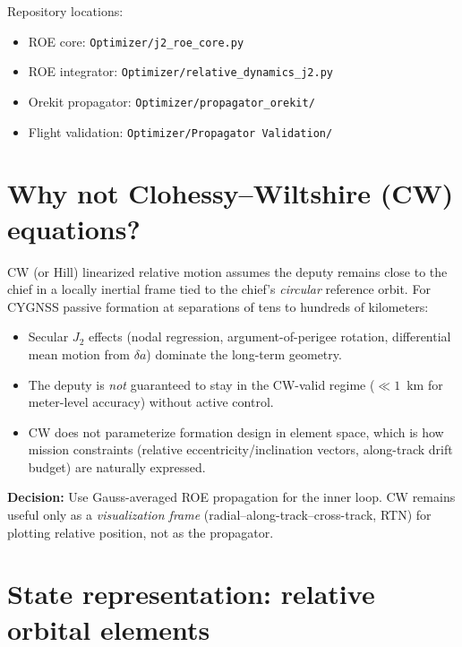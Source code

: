 \documentclass[11pt]{article}
\begin{document}
Repository locations:
\begin{itemize}
    \item ROE core: \texttt{Optimizer/j2\_roe\_core.py}
    \item ROE integrator: \texttt{Optimizer/relative\_dynamics\_j2.py}
    \item Orekit propagator: \texttt{Optimizer/propagator\_orekit/}
    \item Flight validation: \texttt{Optimizer/Propagator Validation/}
\end{itemize}

\section{Why not Clohessy--Wiltshire (CW) equations?}

CW (or Hill) linearized relative motion assumes the deputy remains close to the chief in a locally inertial frame tied to the chief's \emph{circular} reference orbit. For CYGNSS passive formation at separations of tens to hundreds of kilometers:

\begin{itemize}
    \item Secular $J_2$ effects (nodal regression, argument-of-perigee rotation, differential mean motion from $\delta a$) dominate the long-term geometry.
    \item The deputy is \emph{not} guaranteed to stay in the CW-valid regime ($\ll 1$~km for meter-level accuracy) without active control.
    \item CW does not parameterize formation design in element space, which is how mission constraints (relative eccentricity/inclination vectors, along-track drift budget) are naturally expressed.
\end{itemize}

\textbf{Decision:} Use Gauss-averaged ROE propagation for the inner loop. CW remains useful only as a \emph{visualization frame} (radial--along-track--cross-track, RTN) for plotting relative position, not as the propagator.

\section{State representation: relative orbital elements}
\end{document}
